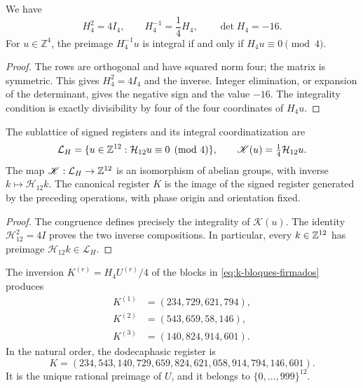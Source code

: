 \begin{lemma}
\label{lem:k-hadamard}
We have
\[
 H_4^2=4I_4,\qquad H_4^{-1}=\frac14H_4,\qquad\det H_4=-16.
\]
For \(u\in\mathbb Z^4\), the preimage \(H_4^{-1}u\) is integral if and
only if \(H_4u\equiv0\pmod4\).
\end{lemma}

\begin{proof}
The rows are orthogonal and have squared norm four; the matrix is
symmetric. This gives \(H_4^2=4I_4\) and the inverse. Integer elimination,
or expansion of the determinant, gives the negative sign and the value \(-16\).
The integrality condition is exactly divisibility by four
of the four coordinates of \(H_4u\).
\end{proof}

\begin{definition}
The sublattice of signed registers and its integral coordinatization are
\[
 \mathcal L_H=\{u\in\mathbb Z^{12}:\mathcal H_{12}u\equiv0\pmod4\},
 \qquad \mathscr K(u)=\tfrac14\mathcal H_{12}u.
\]
The map \(\mathscr K:\mathcal L_H\to\mathbb Z^{12}\) is an isomorphism
of abelian groups, with inverse \(k\mapsto\mathcal H_{12}k\).
The canonical register \(K\) is the image of the signed register generated
by the preceding operations, with phase origin and orientation fixed.
\end{definition}

\begin{proof}
The congruence defines precisely the integrality of \(\mathscr K(u)\).
The identity \(\mathcal H_{12}^2=4I\) proves the two inverse
compositions. In particular, every \(k\in\mathbb Z^{12}\) has preimage
\(\mathcal H_{12}k\in\mathcal L_H\).
\end{proof}

\begin{proposition}
\label{prop:k-sello}
The inversion \(K^{(r)}=H_4U^{(r)}/4\) of the blocks in
\eqref{eq:k-bloques-firmados} produces
\begin{align*}
 K^{(1)}&=(234,729,621,794),\\
 K^{(2)}&=(543,659,58,146),\\
 K^{(3)}&=(140,824,914,601).
\end{align*}
In the natural order, the dodecaphasic register is
\begin{equation}
 K=(234,543,140,729,659,824,621,058,914,794,146,601).
 \label{eq:k-vector}
\end{equation}
It is the unique rational preimage of \(U\), and it belongs to
\(\{0,\ldots,999\}^{12}\).
\end{proposition}

